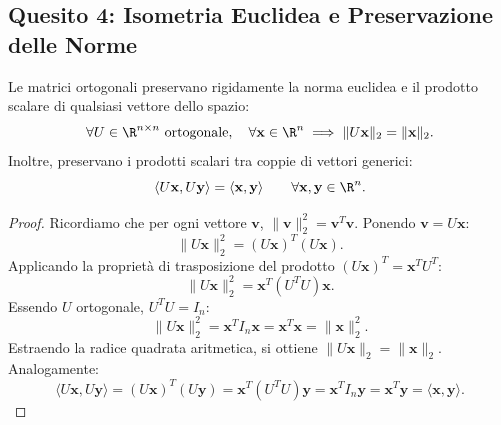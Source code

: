\subsection{Quesito 4: Isometria Euclidea e Preservazione delle Norme}

\begin{theorem}
\label{thm:isometria-ortogonale}
Le matrici ortogonali preservano rigidamente la norma euclidea e il prodotto scalare di qualsiasi vettore dello spazio:
\begin{equation}
    \forall U \in \R^{n \times n} \text{ ortogonale}, \quad \forall \mathbf{x} \in \R^n \implies \|U\mathbf{x}\|_2 = \|\mathbf{x}\|_2.
\end{equation}
Inoltre, preservano i prodotti scalari tra coppie di vettori generici:
\begin{equation}
    \langle U\mathbf{x}, U\mathbf{y} \rangle = \langle \mathbf{x}, \mathbf{y} \rangle \qquad \forall \mathbf{x}, \mathbf{y} \in \R^n.
\end{equation}
\end{theorem}

\begin{proof}
Ricordiamo che per ogni vettore $\mathbf{v}$, $\|\mathbf{v}\|_2^2 = \mathbf{v}^T \mathbf{v}$. Ponendo $\mathbf{v} = U\mathbf{x}$:
\begin{equation}
    \|U\mathbf{x}\|_2^2 = (U\mathbf{x})^T (U\mathbf{x}).
\end{equation}
Applicando la propriet\`a di trasposizione del prodotto $(U\mathbf{x})^T = \mathbf{x}^T U^T$:
\begin{equation}
    \|U\mathbf{x}\|_2^2 = \mathbf{x}^T (U^T U) \mathbf{x}.
\end{equation}
Essendo $U$ ortogonale, $U^T U = I_n$:
\begin{equation}
    \|U\mathbf{x}\|_2^2 = \mathbf{x}^T I_n \mathbf{x} = \mathbf{x}^T \mathbf{x} = \|\mathbf{x}\|_2^2.
\end{equation}
Estraendo la radice quadrata aritmetica, si ottiene $\|U\mathbf{x}\|_2 = \|\mathbf{x}\|_2$. Analogamente:
\begin{equation}
    \langle U\mathbf{x}, U\mathbf{y} \rangle = (U\mathbf{x})^T (U\mathbf{y}) = \mathbf{x}^T (U^T U) \mathbf{y} = \mathbf{x}^T I_n \mathbf{y} = \mathbf{x}^T \mathbf{y} = \langle \mathbf{x}, \mathbf{y} \rangle.
\end{equation}
\end{proof}

